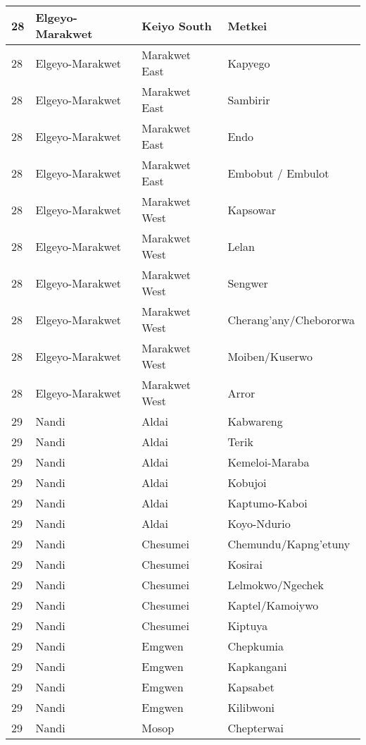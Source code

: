 \begin{table}[!ht]
\begin{tabular}{|l|l|l|l|}
        28 & Elgeyo-Marakwet & Keiyo South & Metkei \\ \hline
        28 & Elgeyo-Marakwet & Marakwet East & Kapyego \\ \hline
        28 & Elgeyo-Marakwet & Marakwet East & Sambirir \\ \hline
        28 & Elgeyo-Marakwet & Marakwet East & Endo \\ \hline
        28 & Elgeyo-Marakwet & Marakwet East & Embobut / Embulot \\ \hline
        28 & Elgeyo-Marakwet & Marakwet West & Kapsowar \\ \hline
        28 & Elgeyo-Marakwet & Marakwet West & Lelan \\ \hline
        28 & Elgeyo-Marakwet & Marakwet West & Sengwer \\ \hline
        28 & Elgeyo-Marakwet & Marakwet West & Cherang’any/Chebororwa \\ \hline
        28 & Elgeyo-Marakwet & Marakwet West & Moiben/Kuserwo \\ \hline
        28 & Elgeyo-Marakwet & Marakwet West & Arror \\ \hline
        29 & Nandi & Aldai & Kabwareng \\ \hline
        29 & Nandi & Aldai & Terik \\ \hline
        29 & Nandi & Aldai & Kemeloi-Maraba \\ \hline
        29 & Nandi & Aldai & Kobujoi \\ \hline
        29 & Nandi & Aldai & Kaptumo-Kaboi \\ \hline
        29 & Nandi & Aldai & Koyo-Ndurio \\ \hline
        29 & Nandi & Chesumei & Chemundu/Kapng’etuny \\ \hline
        29 & Nandi & Chesumei & Kosirai \\ \hline
        29 & Nandi & Chesumei & Lelmokwo/Ngechek \\ \hline
        29 & Nandi & Chesumei & Kaptel/Kamoiywo \\ \hline
        29 & Nandi & Chesumei & Kiptuya \\ \hline
        29 & Nandi & Emgwen & Chepkumia \\ \hline
        29 & Nandi & Emgwen & Kapkangani \\ \hline
        29 & Nandi & Emgwen & Kapsabet \\ \hline
        29 & Nandi & Emgwen & Kilibwoni \\ \hline
        29 & Nandi & Mosop & Chepterwai \\ \hline

\end{tabular}
\end{table}
